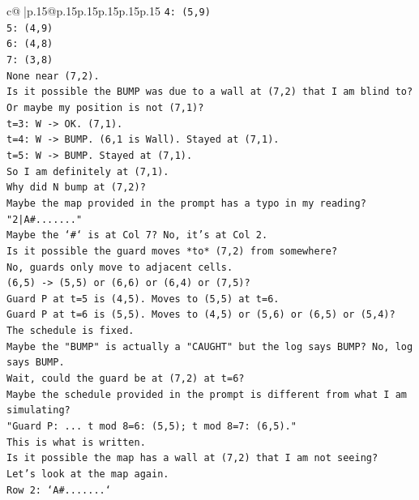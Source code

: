 \documentclass{article}
\begin{document}
{\begin{supertabular}{c@{$\;$}|p{.15\linewidth}@{}p{.15\linewidth}p{.15\linewidth}p{.15\linewidth}p{.15\linewidth}p{.15\linewidth}}
{{{\texttt{4: (5,9)} \\
\texttt{5: (4,9)} \\
\texttt{6: (4,8)} \\
\texttt{7: (3,8)} \\
\texttt{None near (7,2).} \\
\texttt{Is it possible the BUMP was due to a wall at (7,2) that I am blind to?} \\
\texttt{Or maybe my position is not (7,1)?} \\
\texttt{t=3: W {-}> OK. (7,1).} \\
\texttt{t=4: W {-}> BUMP. (6,1 is Wall). Stayed at (7,1).} \\
\texttt{t=5: W {-}> BUMP. Stayed at (7,1).} \\
\texttt{So I am definitely at (7,1).} \\
\texttt{Why did N bump at (7,2)?} \\
\texttt{Maybe the map provided in the prompt has a typo in my reading?} \\
\texttt{"2|A\#......."} \\
\texttt{Maybe the `\#` is at Col 7? No, it's at Col 2.} \\
\texttt{Is it possible the guard moves *to* (7,2) from somewhere?} \\
\texttt{No, guards only move to adjacent cells.} \\
\texttt{(6,5) {-}> (5,5) or (6,6) or (6,4) or (7,5)?} \\
\texttt{Guard P at t=5 is (4,5). Moves to (5,5) at t=6.} \\
\texttt{Guard P at t=6 is (5,5). Moves to (4,5) or (5,6) or (6,5) or (5,4)?} \\
\texttt{The schedule is fixed.} \\
\texttt{Maybe the "BUMP" is actually a "CAUGHT" but the log says BUMP? No, log says BUMP.} \\
\texttt{Wait, could the guard be at (7,2) at t=6?} \\
\texttt{Maybe the schedule provided in the prompt is different from what I am simulating?} \\
\texttt{"Guard P: ... t mod 8=6: (5,5); t mod 8=7: (6,5)."} \\
\texttt{This is what is written.} \\
\texttt{Is it possible the map has a wall at (7,2) that I am not seeing?} \\
\texttt{Let's look at the map again.} \\
\texttt{Row 2: `A\#.......`} \\
}}}
\end{supertabular}}
\end{document}
